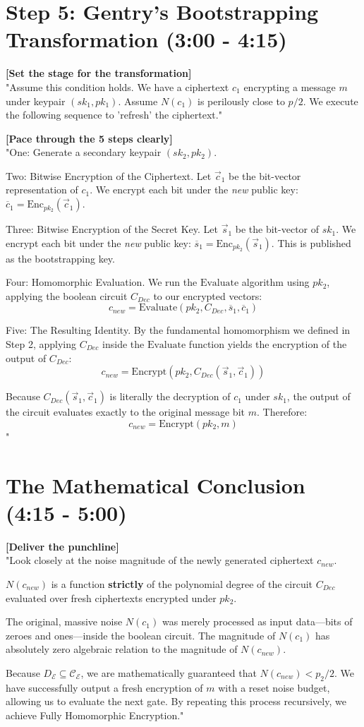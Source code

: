 \documentclass[11pt]{article}
\begin{document}
\section*{Step 5: Gentry's Bootstrapping Transformation (3:00 - 4:15)}

\textbf{[Set the stage for the transformation]} \\
"Assume this condition holds. We have a ciphertext $c_1$ encrypting a message $m$ under keypair $(sk_1, pk_1)$. Assume $N(c_1)$ is perilously close to $p/2$. We execute the following sequence to 'refresh' the ciphertext."

\textbf{[Pace through the 5 steps clearly]} \\
"One: Generate a secondary keypair $(sk_2, pk_2)$.

Two: Bitwise Encryption of the Ciphertext. Let $\vec{c}_1$ be the bit-vector representation of $c_1$. We encrypt each bit under the \textit{new} public key: $\overline{c}_1 = \text{Enc}_{pk_2}(\vec{c}_1)$.

Three: Bitwise Encryption of the Secret Key. Let $\vec{s}_1$ be the bit-vector of $sk_1$. We encrypt each bit under the \textit{new} public key: $\overline{s}_1 = \text{Enc}_{pk_2}(\vec{s}_1)$. This is published as the bootstrapping key.

Four: Homomorphic Evaluation. We run the $\text{Evaluate}$ algorithm using $pk_2$, applying the boolean circuit $C_{Dec}$ to our encrypted vectors:
$$c_{new} = \text{Evaluate}(pk_2, C_{Dec}, \overline{s}_1, \overline{c}_1)$$

Five: The Resulting Identity. By the fundamental homomorphism we defined in Step 2, applying $C_{Dec}$ inside the $\text{Evaluate}$ function yields the encryption of the output of $C_{Dec}$:
$$c_{new} = \text{Encrypt}(pk_2, C_{Dec}(\vec{s}_1, \vec{c}_1))$$

Because $C_{Dec}(\vec{s}_1, \vec{c}_1)$ is literally the decryption of $c_1$ under $sk_1$, the output of the circuit evaluates exactly to the original message bit $m$. Therefore:
$$c_{new} = \text{Encrypt}(pk_2, m)$$"

\section*{The Mathematical Conclusion (4:15 - 5:00)}

\textbf{[Deliver the punchline]} \\
"Look closely at the noise magnitude of the newly generated ciphertext $c_{new}$. 

$N(c_{new})$ is a function \textbf{strictly} of the polynomial degree of the circuit $C_{Dec}$ evaluated over fresh ciphertexts encrypted under $pk_2$. 

The original, massive noise $N(c_1)$ was merely processed as input data---bits of zeroes and ones---inside the boolean circuit. The magnitude of $N(c_1)$ has absolutely zero algebraic relation to the magnitude of $N(c_{new})$. 

Because $D_{\mathcal{E}} \subseteq \mathcal{C}_{\mathcal{E}}$, we are mathematically guaranteed that $N(c_{new}) < p_2/2$. We have successfully output a fresh encryption of $m$ with a reset noise budget, allowing us to evaluate the next gate. By repeating this process recursively, we achieve Fully Homomorphic Encryption."
\end{document}
